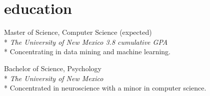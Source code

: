 \documentclass[]{friggeri-cv} %
\begin{document}

\section{education}
\begin{description}
  \item {\largeheaderfont Master of Science, Computer Science}  \hfill 
    { (expected)} \\*
    {\footnotesize \emph{The University of New Mexico  \hfill 3.8 cumulative GPA}} \\*
    Concentrating in data mining and machine learning.
\end{description}
\begin{description}
  \item  {\largeheaderfont Bachelor of Science, Psychology } \hfill
    { }\\*
    {\footnotesize \emph{The University of New Mexico  }} \\*
    Concentrated in neuroscience with a minor in computer science.
\end{description}
\end{document}
